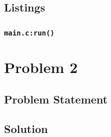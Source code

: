 \documentclass[12pt,a4paper,titlepage,oneside]{article}
\begin{document}
\subsection{Listings}
\subsubsection{\texttt{main.c:run()}}



\newpage
\section{Problem 2}

\subsection{Problem Statement}


\subsection{Solution}
\end{document}
